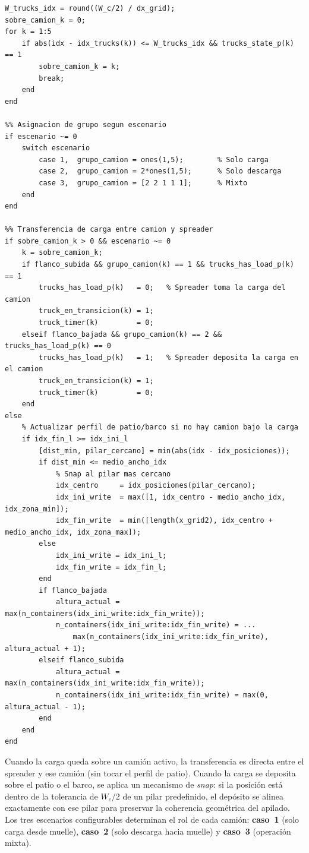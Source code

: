\documentclass[12pt, a4paper]{article}
\begin{document}
\begin{lstlisting}[style=matlab, caption={Identificación del camión bajo la carga y actualización del perfil de contenedores.}, label=lst:perfil-suelo-camiones]
%% Identificar si la carga esta sobre un camion
W_trucks_idx = round((W_c/2) / dx_grid);
sobre_camion_k = 0;
for k = 1:5
    if abs(idx - idx_trucks(k)) <= W_trucks_idx && trucks_state_p(k) == 1
        sobre_camion_k = k;
        break;
    end
end

%% Asignacion de grupo segun escenario
if escenario ~= 0
    switch escenario
        case 1,  grupo_camion = ones(1,5);        % Solo carga
        case 2,  grupo_camion = 2*ones(1,5);      % Solo descarga
        case 3,  grupo_camion = [2 2 1 1 1];      % Mixto
    end
end

%% Transferencia de carga entre camion y spreader
if sobre_camion_k > 0 && escenario ~= 0
    k = sobre_camion_k;
    if flanco_subida && grupo_camion(k) == 1 && trucks_has_load_p(k) == 1
        trucks_has_load_p(k)   = 0;   % Spreader toma la carga del camion
        truck_en_transicion(k) = 1;
        truck_timer(k)         = 0;
    elseif flanco_bajada && grupo_camion(k) == 2 && trucks_has_load_p(k) == 0
        trucks_has_load_p(k)   = 1;   % Spreader deposita la carga en el camion
        truck_en_transicion(k) = 1;
        truck_timer(k)         = 0;
    end
else
    % Actualizar perfil de patio/barco si no hay camion bajo la carga
    if idx_fin_l >= idx_ini_l
        [dist_min, pilar_cercano] = min(abs(idx - idx_posiciones));
        if dist_min <= medio_ancho_idx
            % Snap al pilar mas cercano
            idx_centro     = idx_posiciones(pilar_cercano);
            idx_ini_write  = max([1, idx_centro - medio_ancho_idx, idx_zona_min]);
            idx_fin_write  = min([length(x_grid2), idx_centro + medio_ancho_idx, idx_zona_max]);
        else
            idx_ini_write = idx_ini_l;
            idx_fin_write = idx_fin_l;
        end
        if flanco_bajada
            altura_actual = max(n_containers(idx_ini_write:idx_fin_write));
            n_containers(idx_ini_write:idx_fin_write) = ...
                max(n_containers(idx_ini_write:idx_fin_write), altura_actual + 1);
        elseif flanco_subida
            altura_actual = max(n_containers(idx_ini_write:idx_fin_write));
            n_containers(idx_ini_write:idx_fin_write) = max(0, altura_actual - 1);
        end
    end
end
\end{lstlisting}

Cuando la carga queda sobre un camión activo, la transferencia es directa entre
el spreader y ese camión (sin tocar el perfil de patio). Cuando la carga se deposita
sobre el patio o el barco, se aplica un mecanismo de \textit{snap}: si la posición
está dentro de la tolerancia de $W_c/2$ de un pilar predefinido, el depósito se
alinea exactamente con ese pilar para preservar la coherencia geométrica del apilado.
Los tres escenarios configurables determinan el rol de cada camión: \textbf{caso~1}
(solo carga desde muelle), \textbf{caso~2} (solo descarga hacia muelle) y
\textbf{caso~3} (operación mixta).
\end{document}
